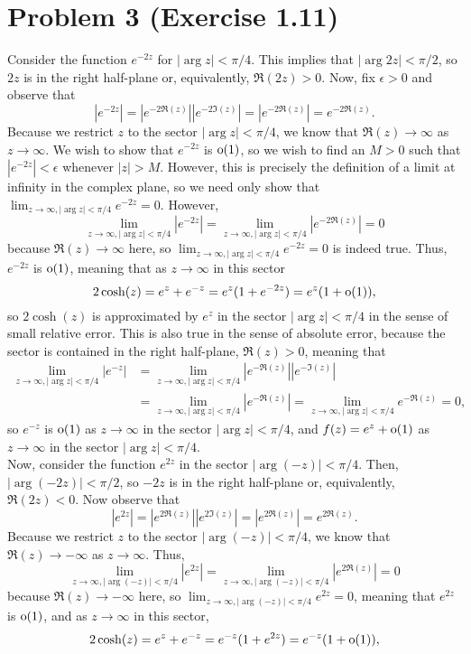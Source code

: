 \documentclass{article}
\begin{document}
\section{Problem 3 (Exercise 1.11)}
Consider the function $e^{-2z}$ for $|\arg z|<\pi/4$. This implies that $|\arg 2z|<\pi/2$, so $2z$ is in the right half-plane or, equivalently, $\Re(2z)>0$. Now, fix $\epsilon>0$ and observe that 
\[
|e^{-2z}|=|e^{-2\Re(z)}||e^{-2\Im(z)}|=|e^{-2\Re(z)}|=e^{-2\Re(z)}.
\]
Because we restrict $z$ to the sector $|\arg z|<\pi/4$, we know that $\Re(z)\to\infty$ as $z\to\infty$. We wish to show that $e^{-2z}$ is $\operatorname{o}(1)$, so we wish to find an $M>0$ such that $|e^{-2z}|<\epsilon$ whenever $|z|>M$. However, this is precisely the definition of a limit at infinity in the complex plane, so we need only show that $\lim_{z\to\infty,|\arg z|<\pi/4}e^{-2z}=0$. However, 
\[
\lim_{z\to\infty,|\arg z|<\pi/4}|e^{-2z}|=\lim_{z\to\infty,|\arg z|<\pi/4}|e^{-2\Re(z)}|=0
\]
because $\Re(z)\to\infty$ here, so $\lim_{z\to\infty,|\arg z|<\pi/4}e^{-2z}=0$ is indeed true. Thus, $e^{-2z}$ is $\operatorname{o}(1)$, meaning that as $z\to\infty$ in this sector
\[
2\cosh(z)=e^z+e^{-z}=e^z(1+e^{-2z})=e^z(1+\operatorname{o}(1)),
\]
so $2\cosh(z)$ is approximated by $e^z$ in the sector $|\arg z|<\pi/4$ in the sense of small relative error. 
This is also true in the sense of absolute error, because the sector is contained in the right half-plane, $\Re(z)>0$, meaning that 
\begin{align*}
\lim_{z\to\infty,|\arg z|<\pi/4}|e^{-z}|&=\lim_{z\to\infty,|\arg z|<\pi/4}|e^{-\Re(z)}||e^{-\Im(z)}|\\&=\lim_{z\to\infty,|\arg z|<\pi/4}|e^{-\Re(z)}|=\lim_{z\to\infty,|\arg z|<\pi/4}e^{-\Re(z)}=0,
\end{align*}
so $e^{-z}$ is $\operatorname{o}(1)$ as $z\to\infty$ in the sector $|\arg z|<\pi/4$, and $f(z)=e^z+\operatorname{o}(1)$ as $z\to\infty$ in the sector $|\arg z|<\pi/4$.\\
Now, consider the function $e^{2z}$ in the sector $|\arg (-z)|<\pi/4$. Then, $|\arg(-2z)|<\pi/2$, so $-2z$ is in the right half-plane or, equivalently, $\Re(2z)<0$. Now observe that 
\[
|e^{2z}|=|e^{2\Re(z)}||e^{2\Im(z)}|=|e^{2\Re(z)}|=e^{2\Re(z)}.
\]
Because we restrict $z$ to the sector $|\arg (-z)|<\pi/4$, we know that $\Re(z)\to-\infty$ as $z\to\infty$. Thus, 
\[
\lim_{z\to\infty,|\arg (-z)|<\pi/4}|e^{2z}|=\lim_{z\to\infty,|\arg (-z)|<\pi/4}|e^{2\Re(z)}|=0
\]
because $\Re(z)\to-\infty$ here, so $\lim_{z\to\infty,|\arg (-z)|<\pi/4}e^{2z}=0$, meaning that $e^{2z}$ is $\operatorname{o}(1)$, and as $z\to\infty$ in this sector,
\[
2\cosh(z)=e^z+e^{-z}=e^{-z}(1+e^{2z})=e^{-z}(1+\operatorname{o}(1)),
\]
\end{document}
